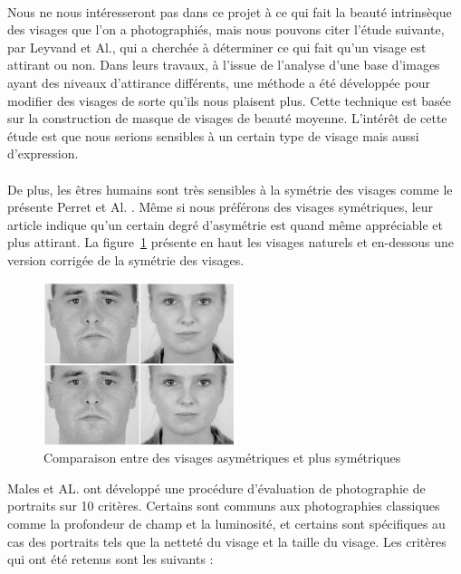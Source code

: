 \documentclass[11pt, french]{report-rd-info}
\begin{document}
\paragraph*{}
Nous ne nous intéresseront pas dans ce projet à ce qui fait la beauté intrinsèque des visages que l'on a photographiés, mais nous pouvons citer l'étude suivante, par Leyvand et Al.\cite{Leyvand2008}, qui a cherchée à déterminer ce qui fait qu'un visage est attirant ou non. Dans leurs travaux, à l'issue de l'analyse d'une base d'images ayant des niveaux d'attirance différents,  une méthode a été développée pour modifier des visages de sorte qu'ils nous plaisent plus. Cette technique est basée sur la construction de masque de visages de beauté moyenne. L'intérêt de cette étude est que nous serions sensibles à un certain type de visage mais aussi d'expression.
\paragraph*{}
De plus, les êtres humains sont très sensibles à la symétrie des visages comme le présente Perret et Al. \cite{Perrett1999}. Même si nous préférons des visages symétriques, leur article indique qu'un certain degré d'asymétrie est quand même appréciable et plus attirant. La figure~\ref{fig:VisagesSymetriques} présente en haut les visages naturels et en-dessous une version corrigée de la symétrie des visages.
\begin{figure}
	\centering
	\includegraphics[width=0.5\textwidth]{Images/ea_visages_symetriques}
	\caption{Comparaison entre des visages asymétriques et plus symétriques\cite{Perrett1999}}
	\label{fig:VisagesSymetriques}
\end{figure}


Males et AL. \cite{Males2013} ont développé une procédure d'évaluation de photographie de portraits sur 10 critères. Certains sont communs aux photographies classiques comme la profondeur de champ et la luminosité, et certains sont spécifiques au cas des portraits tels que la netteté du visage et la taille du visage. Les critères qui ont été retenus sont les suivants :
\end{document}
